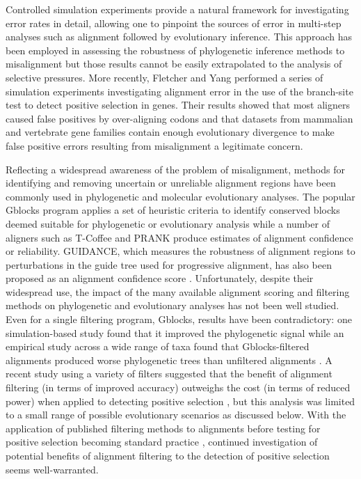 \documentclass{article}
\begin{document}
Controlled simulation experiments provide a natural framework for
investigating error rates in detail, allowing one to pinpoint the
sources of error in multi-step analyses such as alignment followed by
evolutionary inference. This approach has been employed in assessing
the robustness of phylogenetic inference methods to misalignment
\citep{Dwivedi2009Phylogenetic,Ogden2006Multiple,Loytynoja2008PhylogenyAware}
but those results cannot be easily extrapolated to the analysis of \sw
selective pressures. More recently, Fletcher and Yang
\citeyearpar{Fletcher2010Effect} performed a series of simulation
experiments investigating alignment error in the use of the
branch-site test to detect positive selection in genes. Their results
showed that most aligners caused false positives by over-aligning
codons and that datasets from mammalian and vertebrate gene families
contain enough evolutionary divergence to make false positive errors
resulting from misalignment a legitimate concern.

Reflecting a widespread awareness of the problem of misalignment,
methods for identifying and removing uncertain or unreliable alignment
regions have been commonly used in phylogenetic and molecular
evolutionary analyses. The popular Gblocks program applies a set of
heuristic criteria to identify conserved blocks deemed suitable for
phylogenetic or evolutionary analysis \citep{Castresana2000Selection}
while a number of aligners such as T-Coffee
\citep{Notredame2000TCoffee} and PRANK
\citep{Loytynoja2008PhylogenyAware} produce estimates of alignment
confidence or reliability. GUIDANCE, which measures the robustness of
alignment regions to perturbations in the guide tree used for
progressive alignment, has also been proposed as an alignment
confidence score \citep{Penn2010Alignment}. Unfortunately, despite
their widespread use, the impact of the many available alignment
scoring and filtering methods on phylogenetic and evolutionary
analyses has not been well studied. Even for a single filtering
program, Gblocks, results have been contradictory: one
simulation-based study found that it improved the phylogenetic signal
\citep{Talavera2007Improvement} while an empirical study across a wide
range of taxa found that Gblocks-filtered alignments produced worse
phylogenetic trees than unfiltered alignments
\citep{Dessimoz2010Phylogenetic}. A recent study using a variety of
filters suggested that the benefit of alignment filtering (in terms of
improved accuracy) outweighs the cost (in terms of reduced power) when
applied to detecting positive selection \citep{Privman2011Improving},
but this analysis was limited to a small range of possible
evolutionary scenarios as discussed below.  With the application of
published filtering methods to alignments before testing for positive
selection becoming standard practice
\citep{Studer2008Pervasive,Aguileta2009Rapidly}, continued
investigation of potential benefits of alignment filtering to the
detection of positive selection seems well-warranted.
\end{document}
